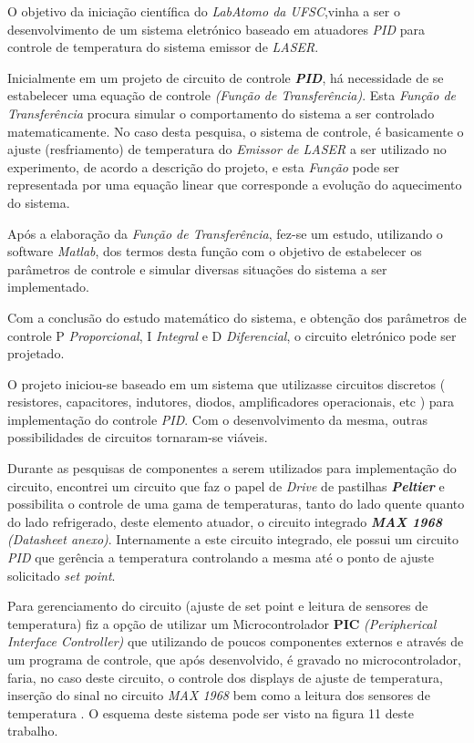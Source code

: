 O objetivo da iniciação científica do \emph{LabAtomo da UFSC},vinha a ser o desenvolvimento de um sistema eletrónico baseado em atuadores \emph{PID} para controle de temperatura do sistema emissor de \emph{LASER}. 

Inicialmente em um  projeto de circuito de controle \textbf{\emph{PID}}, há necessidade de se estabelecer uma equação de controle \textit{(Função de Transferência)}. Esta \emph{Função de Transferência} procura simular o comportamento do sistema a ser controlado matematicamente. No caso desta pesquisa, o sistema de controle, é basicamente o ajuste (resfriamento) de temperatura do \emph{Emissor de LASER} a ser utilizado no experimento, de acordo a descrição do projeto, e esta \emph{Função} pode ser representada por  uma equação linear que corresponde a evolução do aquecimento do sistema. 

Após a elaboração da \emph{Função de Transferência}, fez-se um estudo, utilizando o software \emph{Matlab\tiny\textregistered}, dos termos desta função com o objetivo de estabelecer os parâmetros de controle e simular diversas situações do sistema a ser implementado. 

Com a conclusão do estudo matemático do sistema, e obtenção dos parâmetros de controle P \emph{Proporcional}, I \emph{Integral} e D \emph{Diferencial}, o circuito eletrónico pode ser projetado.

O projeto iniciou-se baseado em um sistema que utilizasse circuitos discretos ( resistores, capacitores, indutores, diodos, amplificadores operacionais, etc ) para implementação do controle \emph{PID}. Com o desenvolvimento da mesma, outras possibilidades de circuitos tornaram-se viáveis. 

Durante as pesquisas de componentes a serem utilizados para implementação do circuito, encontrei um circuito que faz o papel de \emph{Drive} de pastilhas \textbf{\emph{Peltier}} e possibilita o controle de uma gama de temperaturas, tanto do lado quente quanto do lado refrigerado, deste elemento atuador, o circuito integrado \textbf{\emph{MAX 1968}} \emph{(Datasheet anexo)}. Internamente a este circuito integrado, ele possui um circuito \emph{PID} que gerência a temperatura controlando a mesma até o ponto de ajuste solicitado \textit{set point}. 

Para gerenciamento do circuito (ajuste de set point e leitura de sensores de temperatura) fiz a opção de utilizar um Microcontrolador  \textbf{PIC} \emph{(Peripherical Interface Controller) } que utilizando de poucos componentes externos e através de um programa de controle, que após desenvolvido, é gravado no microcontrolador, faria, no caso deste circuito, o controle dos displays de ajuste de temperatura, inserção do sinal no circuito \emph{MAX 1968} bem como a leitura dos sensores de temperatura . O esquema deste sistema pode ser visto na figura 11 deste trabalho.


